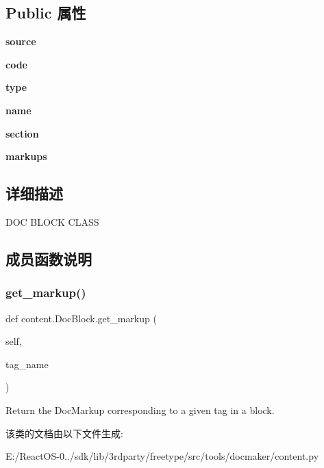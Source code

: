 \subsection*{Public 属性}
\begin{DoxyCompactItemize}
\item 
\mbox{\label{classcontent_1_1_doc_block_a022cea4f2eebe4a3e76e1c8063999e79}} 
{\bfseries source}
\item 
\mbox{\label{classcontent_1_1_doc_block_a5dd8d45ccdac1032c4d0a3fbc60d18c9}} 
{\bfseries code}
\item 
\mbox{\label{classcontent_1_1_doc_block_a285667031a7d794a8ecb06e32da5e4a8}} 
{\bfseries type}
\item 
\mbox{\label{classcontent_1_1_doc_block_a18bfcd6e4ba7f217c7a5262ba831be49}} 
{\bfseries name}
\item 
\mbox{\label{classcontent_1_1_doc_block_a8433d3046a288bfa6916e2e0e1ad040e}} 
{\bfseries section}
\item 
\mbox{\label{classcontent_1_1_doc_block_ae7571470811e61f8b983d44b4e09083d}} 
{\bfseries markups}
\end{DoxyCompactItemize}


\subsection{详细描述}
D\+OC B\+L\+O\+CK C\+L\+A\+SS 

\subsection{成员函数说明}
\mbox{\label{classcontent_1_1_doc_block_a23ba3a31d49b8c270fc1e4fc37be6957}} 
\subsubsection{\texorpdfstring{get\+\_\+markup()}{get\_markup()}}
{\footnotesize\ttfamily def content.\+Doc\+Block.\+get\+\_\+markup (\begin{DoxyParamCaption}\item[{}]{self,  }\item[{}]{tag\+\_\+name }\end{DoxyParamCaption})}

\begin{DoxyVerb}Return the DocMarkup corresponding to a given tag in a block.\end{DoxyVerb}
 

该类的文档由以下文件生成\+:\begin{DoxyCompactItemize}
\item 
E\+:/\+React\+O\+S-\/0../sdk/lib/3rdparty/freetype/src/tools/docmaker/content.\+py\end{DoxyCompactItemize}
